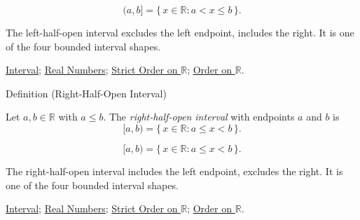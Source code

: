 \begin{remark*}
\[
(a,b]=\{\,x\in\mathbb{R} : a<x\le b\,\}.
\]
\end{remark*}
\begin{remark*}[Interpretation]
The left-half-open interval excludes the left endpoint, includes the right. It is one of the four bounded interval shapes.
\end{remark*}
\begin{dependencies}
\hyperref[def:interval]{Interval};
\hyperref[def:reals]{Real Numbers};
\hyperref[def:strict-order-on-r]{Strict Order on $\mathbb{R}$};
\hyperref[def:order-on-r]{Order on $\mathbb{R}$}.
\end{dependencies}

\begin{definitionbox}{Definition (Right-Half-Open Interval)}
\begin{definition}
\label{def:right-half-open-interval}
Let $a,b\in\mathbb{R}$ with $a\le b$. The \emph{right-half-open interval} with endpoints $a$ and $b$ is
\[
[a,b)=\{\,x\in\mathbb{R} : a\le x<b\,\}.
\]
\end{definition}
\end{definitionbox}
\begin{remark*}
\[
[a,b)=\{\,x\in\mathbb{R} : a\le x<b\,\}.
\]
\end{remark*}
\begin{remark*}[Interpretation]
The right-half-open interval includes the left endpoint, excludes the right. It is one of the four bounded interval shapes.
\end{remark*}
\begin{dependencies}
\hyperref[def:interval]{Interval};
\hyperref[def:reals]{Real Numbers};
\hyperref[def:strict-order-on-r]{Strict Order on $\mathbb{R}$};
\hyperref[def:order-on-r]{Order on $\mathbb{R}$}.
\end{dependencies}


